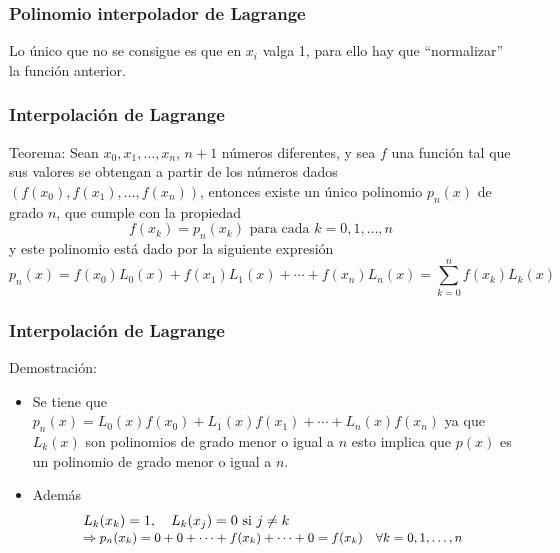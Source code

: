\documentclass[10pt]{beamer}
\begin{document}
\frame
{\frametitle{Polinomio interpolador de Lagrange}
Lo \'unico que no se consigue es que en $x_i$ valga 1, para ello hay que ``normalizar'' la funci\'on anterior.

}
\begin{frame}
  \frametitle{Interpolaci\'on de Lagrange}
\begin{block}{Teorema:}
  Sean $x_0, x_1, \ldots , x_n$, $n + 1$ n\'umeros diferentes, y sea $f$ una funci\'on tal que
sus valores se obtengan a partir de los n\'umeros dados $(f(x_0), f(x_1), \ldots , f(x_n))$, entonces
existe un \'unico polinomio $p_n(x)$ de grado $n$, que cumple con la propiedad
$$
f(x_k) = p_n(x_k) \text{ para cada }k = 0,1, \ldots , n
$$
y este polinomio est\'a dado por la siguiente expresi\'on
\small{
$$
p_n(x) = f(x_0)L_0(x) + f(x_1)L_1(x) + \cdots + f(x_n)L_n(x) = \sum_{k=0}^nf(x_k)L_k(x)
$$}
\end{block}
\end{frame}
\begin{frame}
  \frametitle{Interpolaci\'on de Lagrange}
  Demostraci\'on:
  \begin{itemize}
    \item Se tiene que $p_n(x)=L_0(x)f(x_0)+L_1(x)f(x_1)+\cdots+L_n(x)f(x_n)$ ya que $L_k(x)$ 
    son polinomios de grado menor o igual a $n$ esto implica que $p(x)$ es un polinomio de grado menor o igual a $n$.
    \item<2-> Adem\'as
    $$
    \begin{array}{l}
    L_k(x_k) = 1,\quad L_k(x_j) =0 \mbox{ si $j \neq k$}\\
    \text{\small $\Rightarrow p_n(x_k) = 0 + 0 + \cdots + f(x_k) + \cdots + 0 = f(x_k) \quad \forall k=0,1,\ldots,n$}
    \end{array}
    $$
  \end{itemize}
\end{frame}
\end{document}
